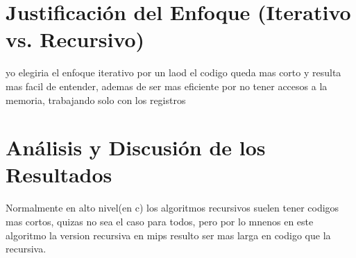\documentclass{article}
\begin{document}
\section{Justificación del Enfoque (Iterativo vs. Recursivo)}
yo elegiria el enfoque iterativo por un laod el codigo queda mas corto y resulta mas facil de entender, ademas de ser mas eficiente por no tener accesos a la memoria, trabajando solo con los registros

\section{Análisis y Discusión de los Resultados}
Normalmente en alto nivel(en c) los algoritmos recursivos suelen tener codigos mas cortos, quizas no sea el caso para todos, pero por lo mnenos en este algoritmo la version recursiva en mips resulto ser mas larga en codigo que la recursiva.
\end{document}
